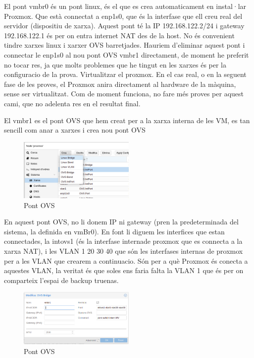 \documentclass[
  10pt,
]{krantz}
\begin{document}
El pont vmbr0 és un pont linux, és el que es crea automaticament en instal·lar Proxmox. Que està connectat a enp1s0, que és la interfase que ell creu real del servidor (dispositiu de xarxa). Aquest pont té la IP 192.168.122.2/24 i gateway 192.168.122.1 és per on entra internet NAT des de la host. No és convenient tindre xarxes linux i xarxer OVS barretjades. Hauriem d'eliminar aquest pont i connectar le enp1s0 al nou pont OVS vmbr1 directament, de moment he preferit no tocar res, ja que molts problemes que he tingut en les xarxes és per la configuracio de la prova. Virtualitzar el proxmox. En el cas real, o en la seguent fase de les proves, el Proxmox anira directament al hardware de la màquina, sense ser virtualitzat. Com de moment funciona, no fare més proves per aquest cami, que no adelenta res en el resultat final.

El vmbr1 es el pont OVS que hem creat per a la xarxa interna de les VM, es tan sencill com anar a xarxes i crea nou pont OVS

\begin{figure}
\centering
\includegraphics[width=0.5\textwidth,height=\textheight]{imatges/proxmox/Pont_OVS1.png}
\caption{Pont OVS}
\end{figure}

En aquest pont OVS, no li donem IP ni gateway (pren la predeterminada del sistema, la definida en vmBr0). En font li diguem les interfices que estan connectades, la intovs1 (és la interfase internade proxmox que es connecta a la xarxa NAT), i les VLAN 1 20 30 40 que són les interfases internas de proxmox per a les VLAN que crearem a continuacio. Són per a què Proxmox és conecta a aquestes VLAN, la veritat és que soles ens faria falta la VLAN 1 que és per on comparteix l'espai de backup truenas.

\begin{figure}
\centering
\includegraphics[width=0.5\textwidth,height=\textheight]{imatges/proxmox/pont_OVS2.png}
\caption{Pont OVS}
\end{figure}
\end{document}
